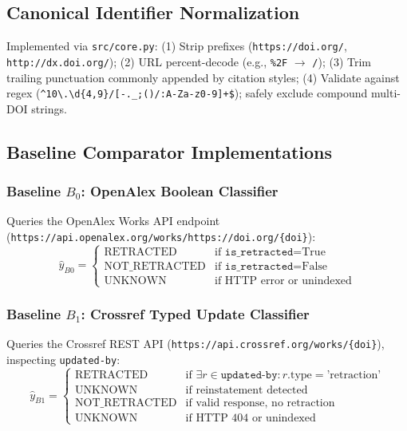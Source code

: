 \documentclass[10pt,a4paper,twocolumn]{article}
\begin{document}
\subsection{Canonical Identifier Normalization}
Implemented via \texttt{src/core.py}:
(1) Strip prefixes (\texttt{https://doi.org/}, \texttt{http://dx.doi.org/});
(2) URL percent-decode (e.g., \texttt{\%2F} $\rightarrow$ \texttt{/});
(3) Trim trailing punctuation commonly appended by citation styles;
(4) Validate against regex (\texttt{\^{}10\textbackslash.\textbackslash{}d\{4,9\}/[-.\_;()/:A-Za-z0-9]+\$}); safely exclude compound multi-DOI strings.

\subsection{Baseline Comparator Implementations}

\subsubsection{Baseline $B_0$: OpenAlex Boolean Classifier}
Queries the OpenAlex Works API endpoint (\texttt{https://api.openalex.org/works/https://doi.org/\{doi\}}):
\begin{equation}
\hat{y}_{B0} = \begin{cases}
\text{RETRACTED} & \text{if } \texttt{is\_retracted} = \text{True} \\
\text{NOT\_RETRACTED} & \text{if } \texttt{is\_retracted} = \text{False} \\
\text{UNKNOWN} & \text{if HTTP error or unindexed}
\end{cases}
\end{equation}

\subsubsection{Baseline $B_1$: Crossref Typed Update Classifier}
Queries the Crossref REST API (\texttt{https://api.crossref.org/works/\{doi\}}), inspecting \texttt{updated-by}:
\begin{equation}
\hat{y}_{B1} = \begin{cases}
\text{RETRACTED} & \text{if } \exists r \in \texttt{updated-by}: r.\text{type} = \text{'retraction'} \\
\text{UNKNOWN} & \text{if reinstatement detected} \\
\text{NOT\_RETRACTED} & \text{if valid response, no retraction} \\
\text{UNKNOWN} & \text{if HTTP 404 or unindexed}
\end{cases}
\end{equation}
\end{document}
